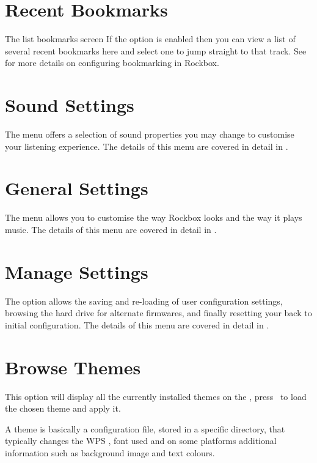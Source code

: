 \section {Recent Bookmarks}
%
  {The list bookmarks screen}{}
If the  option is enabled 
then you can view a list of several recent bookmarks here and select one to 
jump straight to that track. See  
for more details on configuring bookmarking in Rockbox.

\section{Sound Settings}
The  menu offers a selection of sound properties you may 
change to customise your listening experience.  The details of this menu are 
covered in detail in . 

\section{General Settings}
The  menu allows you to customise the way Rockbox looks 
and the way it plays music.  The details of this menu are covered in detail in 
.

\section{Manage Settings}
The  option allows the saving and re-loading of user 
configuration settings, browsing the hard drive for alternate firmwares, and finally
resetting your \dap{} back to initial configuration.
%
%
The details of this menu are covered in detail in 
.

\section{Browse Themes}
This option will display all the currently installed themes on the \dap, 
press \ButtonRight\ to load the chosen theme and apply it.

A theme is basically a configuration file, stored in a specific directory, 
that typically changes the WPS 
, font used and on some platforms
additional information such as background image and text colours.

